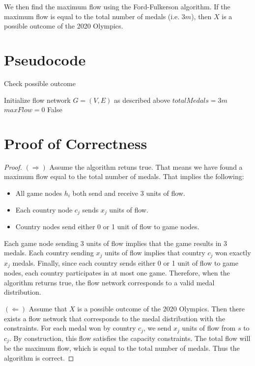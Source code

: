 \documentclass{article}
\begin{document}
We then find the maximum flow using the Ford-Fulkerson algorithm.
If the maximum flow is equal to the total number of medals (i.e. $3m$), then $X$ is a possible outcome of the 2020 Olympics.


\section{Pseudocode}

\begin{algorithm}[H]
    \caption{Check possible outcome}
    \BlankLine
    Initialize flow network $G = (V, E)$ as described above\;
    $totalMedals = 3m$\;
    $maxFlow = 0$\;
    \Return False\;
\end{algorithm}

\section{Proof of Correctness}

\begin{proof}
    $(\Rightarrow)$ Assume the algorithm retuns true.
    That means we have found a maximum flow equal to the total number of medals.
    That implies the following:
    \begin{itemize}
        \item All game nodes $h_i$ both send and receive 3 units of flow.
        \item Each country node $c_j$ sends $x_j$ units of flow.
        \item Country nodes send either 0 or 1 unit of flow to game nodes.
    \end{itemize}
    Each game node sending 3 units of flow implies that the game results in 3 medals.
    Each country sending $x_j$ units of flow implies that country $c_j$ won exactly $x_j$ medals.
    Finally, since each country sends either 0 or 1 unit of flow to game nodes, each country participates in at most one game.
    Therefore, when the algorithm returns true, the flow network corresponds to a valid medal distribution.
    \vspace{1em}

    \noindent $(\Leftarrow)$ Assume that $X$ is a possible outcome of the 2020 Olympics.
    Then there exists a flow network that corresponds to the medal distribution with the constraints.
    For each medal won by country $c_j$, we send $x_j$ units of flow from $s$ to $c_j$.
    By construction, this flow satisfies the capacity constraints.
    The total flow will be the maximum flow, which is equal to the total number of medals.
    Thus the algorithm is correct.
\end{proof}
\end{document}
